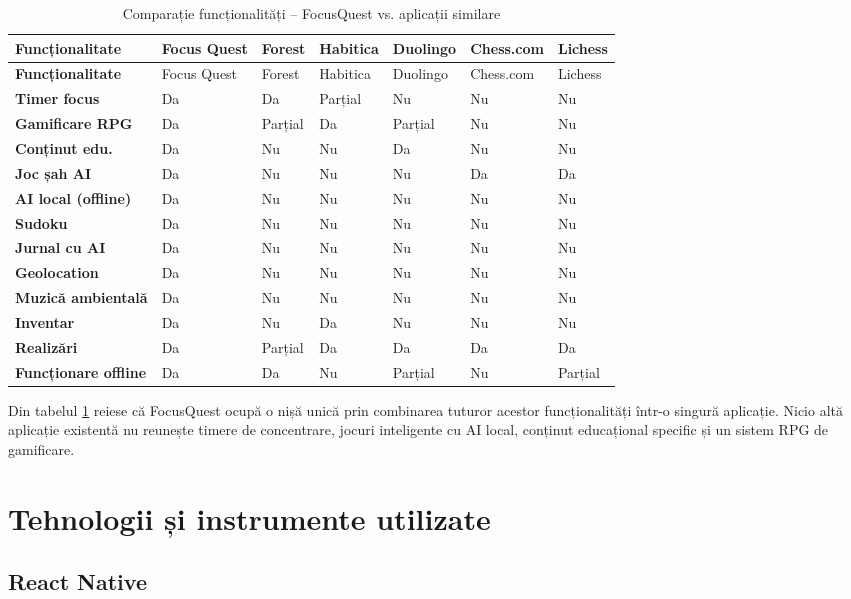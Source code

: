 \documentclass[12pt, a4paper, twoside]{report}
\numberwithin{equation}{section}
\begin{document}
\begin{longtable}{>{\bfseries}p{3.5cm} p{1.4cm} p{1.4cm} p{1.4cm} p{1.4cm} p{1.4cm} p{1.4cm}}
\caption{Comparație funcționalități -- FocusQuest vs. aplicații similare}
\label{tab:comparison}\\
\toprule
Funcționalitate & Focus Quest & Forest & Habitica & Duolingo & Chess.com & Lichess \\
\midrule
\endfirsthead
\toprule
Funcționalitate & Focus Quest & Forest & Habitica & Duolingo & Chess.com & Lichess \\
\midrule
\endhead
\bottomrule
\endfoot
Timer focus & Da & Da & Parțial & Nu & Nu & Nu \\
Gamificare RPG & Da & Parțial & Da & Parțial & Nu & Nu \\
Conținut edu. & Da & Nu & Nu & Da & Nu & Nu \\
Joc șah AI & Da & Nu & Nu & Nu & Da & Da \\
AI local (offline) & Da & Nu & Nu & Nu & Nu & Nu \\
Sudoku & Da & Nu & Nu & Nu & Nu & Nu \\
Jurnal cu AI & Da & Nu & Nu & Nu & Nu & Nu \\
Geolocation & Da & Nu & Nu & Nu & Nu & Nu \\
Muzică ambientală & Da & Nu & Nu & Nu & Nu & Nu \\
Inventar & Da & Nu & Da & Nu & Nu & Nu \\
Realizări & Da & Parțial & Da & Da & Da & Da \\
Funcționare offline & Da & Da & Nu & Parțial & Nu & Parțial \\
\bottomrule
\end{longtable}

Din tabelul \ref{tab:comparison} reiese că FocusQuest ocupă o nișă unică prin combinarea
tuturor acestor funcționalități într-o singură aplicație. Nicio altă aplicație existentă
nu reunește timere de concentrare, jocuri inteligente cu AI local, conținut educațional
specific și un sistem RPG de gamificare.

\chapter{Tehnologii și instrumente utilizate}

\section{React Native}
\end{document}
